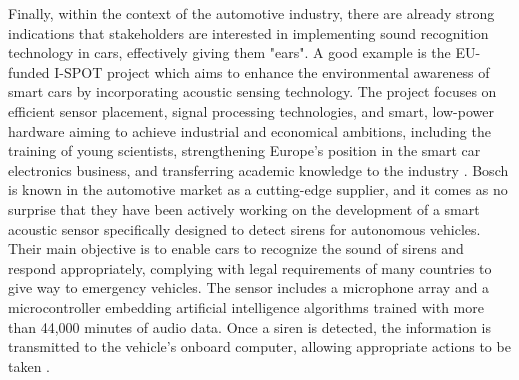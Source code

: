 Finally, within the context of the automotive industry, there are already strong indications that stakeholders are interested in implementing sound recognition technology in cars, effectively giving them "ears". A good example is the EU-funded I-SPOT project which aims to enhance the environmental awareness of smart cars by incorporating acoustic sensing technology. The project focuses on efficient sensor placement, signal processing technologies, and smart, low-power hardware aiming to achieve industrial and economical ambitions, including the training of young scientists, strengthening Europe's position in the smart car electronics business, and transferring academic knowledge to the industry \cite{ISPOT2020}. Bosch is known in the automotive market as a cutting-edge supplier, and it comes as no surprise that they have been actively working on the development of a smart acoustic sensor specifically designed to detect sirens for autonomous vehicles. Their main objective is to enable cars to recognize the sound of sirens and respond appropriately, complying with legal requirements of many countries to give way to emergency vehicles. The sensor includes a microphone array and a microcontroller embedding artificial intelligence algorithms trained with more than 44,000 minutes of audio data. Once a siren is detected, the information is transmitted to the vehicle's onboard computer, allowing appropriate actions to be taken \cite{BOSCH2024}.

